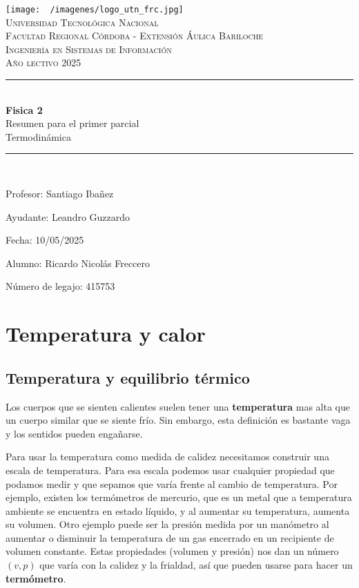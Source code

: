\documentclass[12pt]{article}
\begin{document}
  \begin{titlepage}
    \centering
    \texttt{[image: ~/imagenes/logo\_utn\_frc.jpg]}\\

    \textsc{
      \LARGE Universidad Tecnológica Nacional\\
      \Large Facultad Regional Córdoba - Extensión Áulica Bariloche\\
      \large Ingeniería en Sistemas de Información\\
      Año lectivo 2025\\[0.5cm]
    }

    \rule{\linewidth}{1.0mm}\\[0.4cm]
    \Huge
    \textbf{Fisica 2}\\
    Resumen para el primer parcial\\[0.2cm]
    \LARGE
    Termodinámica
    \rule{\linewidth}{1.0mm}\\
    \large
    \begin{flushleft}
      Profesor: Santiago Ibañez

      Ayudante: Leandro Guzzardo

      Fecha: 10/05/2025
    \end{flushleft}

    \vfill
    \begin{flushright}
      Alumno: Ricardo Nicolás Freccero  

      Número de legajo: 415753
    \end{flushright}
  \end{titlepage}
  
  \restoregeometry
  \tableofcontents
  \newpage

  \section{Temperatura y calor}
  \subsection{Temperatura y equilibrio térmico}
  Los cuerpos que se sienten calientes suelen tener una \textbf{temperatura} mas alta que un cuerpo similar que se siente frío. Sin embargo, esta definición es bastante vaga y los sentidos pueden engañarse.

  Para usar la temperatura como medida de calidez necesitamos construir una escala de temperatura. Para esa escala podemos usar cualquier propiedad que podamos medir y que sepamos que varía frente al cambio de temperatura. Por ejemplo, existen los termómetros de mercurio, que es un metal que a temperatura ambiente se encuentra en estado líquido, y al aumentar su temperatura, aumenta su volumen. Otro ejemplo puede ser la presión medida por un manómetro al aumentar o disminuir la temperatura de un gas encerrado en un recipiente de volumen constante. Estas propiedades (volumen y presión) nos dan un número $ (v,p) $ que varía con la calidez y la frialdad, así que pueden usarse para hacer un \textbf{termómetro}.
\end{document}
